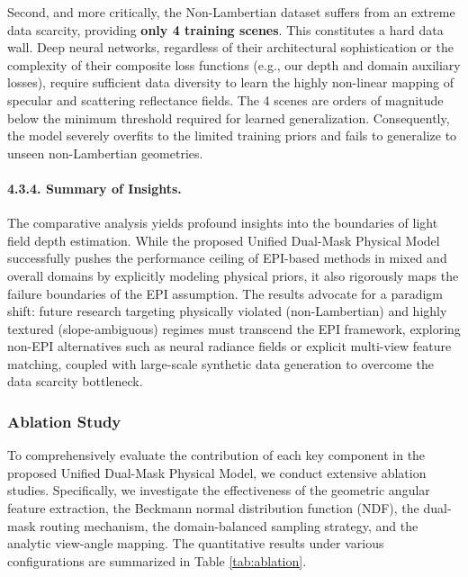 Second, and more critically, the Non-Lambertian dataset suffers from an extreme data scarcity, providing \textbf{only 4 training scenes}. This constitutes a hard data wall. Deep neural networks, regardless of their architectural sophistication or the complexity of their composite loss functions (e.g., our depth and domain auxiliary losses), require sufficient data diversity to learn the highly non-linear mapping of specular and scattering reflectance fields. The 4 scenes are orders of magnitude below the minimum threshold required for learned generalization. Consequently, the model severely overfits to the limited training priors and fails to generalize to unseen non-Lambertian geometries. 

\paragraph{4.3.4. Summary of Insights.}
The comparative analysis yields profound insights into the boundaries of light field depth estimation. While the proposed Unified Dual-Mask Physical Model successfully pushes the performance ceiling of EPI-based methods in mixed and overall domains by explicitly modeling physical priors, it also rigorously maps the failure boundaries of the EPI assumption. The results advocate for a paradigm shift: future research targeting physically violated (non-Lambertian) and highly textured (slope-ambiguous) regimes must transcend the EPI framework, exploring non-EPI alternatives such as neural radiance fields or explicit multi-view feature matching, coupled with large-scale synthetic data generation to overcome the data scarcity bottleneck.

\subsubsection{Ablation Study}

To comprehensively evaluate the contribution of each key component in the proposed Unified Dual-Mask Physical Model, we conduct extensive ablation studies. Specifically, we investigate the effectiveness of the geometric angular feature extraction, the Beckmann normal distribution function (NDF), the dual-mask routing mechanism, the domain-balanced sampling strategy, and the analytic view-angle mapping. The quantitative results under various configurations are summarized in Table \ref{tab:ablation}.

